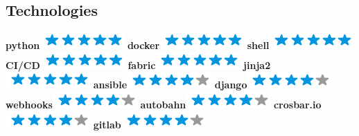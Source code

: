 \documentclass[]{friggeri-cv}
\begin{document}
\begin{aside}
    \section{Technologies}
        \textbf{python}\includegraphics[scale=0.40]{img/5stars.png}
        \textbf{docker}\includegraphics[scale=0.40]{img/5stars.png}
        \textbf{shell}\includegraphics[scale=0.40]{img/5stars.png}
        \textbf{CI/CD}\includegraphics[scale=0.40]{img/5stars.png}
        \textbf{fabric}\includegraphics[scale=0.40]{img/5stars.png}
        \textbf{jinja2}\includegraphics[scale=0.40]{img/5stars.png}
        \textbf{ansible}\includegraphics[scale=0.40]{img/4stars.png}
        \textbf{django}\includegraphics[scale=0.40]{img/4stars.png}
        \textbf{webhooks}\includegraphics[scale=0.40]{img/4stars.png}
        \textbf{autobahn}\includegraphics[scale=0.40]{img/4stars.png}
        \textbf{crosbar.io}\includegraphics[scale=0.40]{img/4stars.png}
        \textbf{gitlab}\includegraphics[scale=0.40]{img/4stars.png}

\end{aside}
\end{document}
